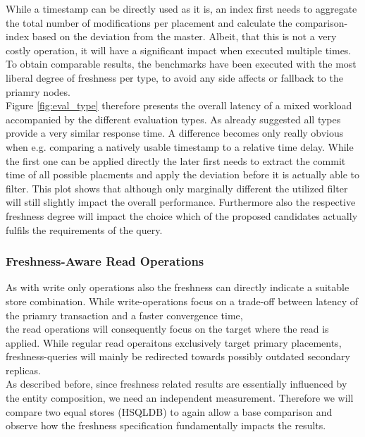 While a timestamp can be directly used as it is, an index first needs to aggregate the total number of modifications per placement and 
calculate the comparison-index based on the deviation from the master.
Albeit, that this is not a very costly operation, it will have a significant impact when executed multiple times.
To obtain comparable results, the benchmarks have been executed with the most liberal degree of freshness per type, to avoid any side affects or fallback to the priamry nodes.\\
Figure \ref{fig:eval_type} therefore presents the overall latency of a mixed workload accompanied by the different evaluation types.
As already suggested all types provide a very similar response time. A difference becomes only really obvious when e.g. comparing a natively usable
timestamp to a relative time delay. While the first one can be applied directly the later first
needs to extract the commit time of all possible placments and apply the deviation before it is actually able to filter.
This plot shows that although only marginally different the utilized filter will still slightly impact the overall performance.
Furthermore also the respective freshness degree will impact the choice which of the proposed candidates actually fulfils the requirements of the query.






\subsubsection{Freshness-Aware Read Operations}

As with write only operations also the freshness can directly indicate a suitable store combination.
While write-operations focus on a trade-off between latency of the priamry transaction and a faster convergence time,\\
the read operations will consequently focus on the target where the read is applied. While regular read operaitons exclusively target
primary placements, freshness-queries will mainly be redirected towards possibly outdated secondary replicas.\\


As described before, since freshness related results are essentially influenced by the entity composition, we need an independent measurement.
Therefore we will  compare two equal stores (HSQLDB) to again allow a base comparison and observe how the freshness specification fundamentally impacts the results.\\


